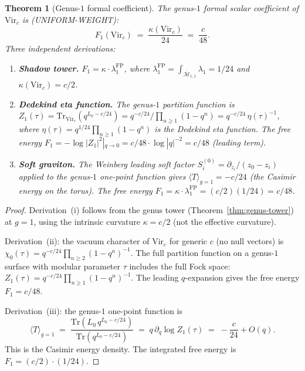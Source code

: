\documentclass[11pt,reqno]{amsart}
\newtheorem{theorem}{Theorem}[section]
\theoremstyle{definition}
\theoremstyle{remark}
\begin{document}
\begin{theorem}[Genus-$1$ formal coefficient]
\label{thm:F1-derivation}
The genus-$1$ formal scalar coefficient of\/ $\mathrm{Vir}_c$ is
(UNIFORM-WEIGHT):
\begin{equation}\label{eq:F1-explicit}
F_1(\mathrm{Vir}_c) \;=\;
\frac{\kappa(\mathrm{Vir}_c)}{24}
\;=\;
\frac{c}{48}.
\end{equation}
Three independent derivations:
\begin{enumerate}[label=\textup{(\roman*)},itemsep=2pt]
\item \textbf{Shadow tower.}
  $F_1 = \kappa \cdot \lambda_1^{\mathrm{FP}}$,
  where $\lambda_1^{\mathrm{FP}}
  = \int_{\overline{\mathcal{M}}_{1,1}} \lambda_1
  = 1/24$ and
  $\kappa(\mathrm{Vir}_c) = c/2$.
\item \textbf{Dedekind eta function.}
  The genus-$1$ partition function is
  $Z_1(\tau) = \mathrm{Tr}_{\mathrm{Vir}_c}
  (q^{L_0 - c/24}) = q^{-c/24}/\prod_{n \ge 1}(1-q^n)
  = q^{-c/24}\,\eta(\tau)^{-1}$,
  where $\eta(\tau) = q^{1/24}\prod_{n \ge 1}(1-q^n)$ is the
  Dedekind eta function. The free energy
  $F_1 = -\log|Z_1|^2|_{q \to 0}
  = c/48 \cdot \log|q|^{-2} = c/48$ (leading term).
\item \textbf{Soft graviton.}
  The Weinberg leading soft factor
  $S^{(0)}_i = \partial_{z_i}/(z_0 - z_i)$ applied to the
  genus-$1$ one-point function gives
  $\langle T \rangle_{g=1} = -c/24$ (the Casimir energy
  on the torus). The free energy
  $F_1 = \kappa \cdot \lambda_1^{\mathrm{FP}}
  = (c/2)(1/24) = c/48$.
\end{enumerate}
\end{theorem}

\begin{proof}
Derivation~(i) follows from the genus tower
(Theorem~\ref{thm:genus-tower}) at $g = 1$, using the intrinsic
curvature $\kappa = c/2$ (not the effective curvature).

Derivation~(ii): the vacuum character of $\mathrm{Vir}_c$
for generic $c$ (no null vectors) is
$\chi_0(\tau) = q^{-c/24}\prod_{n \ge 2}(1-q^n)^{-1}$.
The full partition function on a genus-$1$ surface
with modular parameter $\tau$ includes the full
Fock space: $Z_1(\tau) = q^{-c/24}\prod_{n \ge 1}(1-q^n)^{-1}$.
The leading $q$-expansion gives the free energy
$F_1 = c/48$.

Derivation~(iii): the genus-$1$ one-point function is
\[
\langle T \rangle_{g=1}
\;=\;
\frac{\mathrm{Tr}(L_0\,q^{L_0 - c/24})}
     {\mathrm{Tr}(q^{L_0 - c/24})}
\;=\;
q\,\partial_q \log Z_1(\tau)
\;=\;
-\frac{c}{24} + O(q).
\]
This is the Casimir energy density. The integrated free energy
is $F_1 = (c/2) \cdot (1/24)$.
\end{proof}
\end{document}
